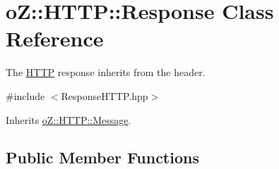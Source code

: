 \hypertarget{classo_z_1_1_h_t_t_p_1_1_response}{}\section{oZ\+::H\+T\+TP\+::Response Class Reference}
\label{classo_z_1_1_h_t_t_p_1_1_response}


The \mbox{\hyperlink{namespaceo_z_1_1_h_t_t_p}{H\+T\+TP}} response inherits from the header.  




{\ttfamily \#include $<$Response\+H\+T\+T\+P.\+hpp$>$}



Inherits \mbox{\hyperlink{classo_z_1_1_h_t_t_p_1_1_message}{o\+Z\+::\+H\+T\+T\+P\+::\+Message}}.

\subsection*{Public Member Functions}
